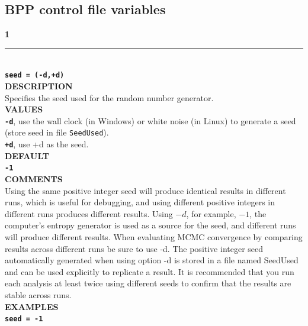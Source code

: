 \documentclass[a4paper]{book}
\numberwithin{equation}{section} \renewcommand{\baselinestretch}{0.55}
\begin{document}
\newpage
\subsection{BPP control file variables} \label{controlfilevariables}
\textbf{{\large 1}} \\
\noindent\rule{\textwidth}{0.8pt} \\
\textbf{{\Large \texttt{seed = (-d,+d)}}} \vspace{5pt}\\
\textbf{DESCRIPTION} \vspace{5pt}\\
Specifies the seed used for the random number generator.\vspace{5pt}\\
\textbf{VALUES} \vspace{5pt}\\
\textbf{\texttt{-d}}, use the wall clock (in Windows) or white noise (in Linux) to generate a seed (store seed in file \texttt{SeedUsed}).\vspace{5pt}\\
\textbf{\texttt{+d}}, use +d as the seed.\vspace{10pt}\\
\textbf{DEFAULT} \vspace{5pt}\\
\textbf{\texttt{-1}} \vspace{5pt}\\
\textbf{COMMENTS} \vspace{5pt}\\
Using the same positive integer seed will produce identical results in
different runs, which is useful for debugging, and using different
positive integers in different runs produces different results.  Using
$-d$, for example, $-1$, the computer's entropy generator is used as a source for the seed, and
different runs will produce different results. When evaluating MCMC convergence
by comparing results across different runs be sure to use -d. The positive integer
seed automatically generated when using option -d is stored in a file named SeedUsed and
can be used explicitly to replicate a result. It is recommended that
you run each analysis at least twice using different seeds to confirm that the results are stable across runs. \vspace{5pt}\\
\textbf{EXAMPLES} \vspace{5pt}\\
\textbf{\texttt{seed = -1}}\vspace{5pt}\\
\end{document}
